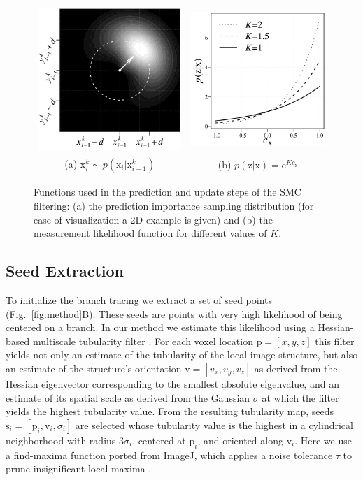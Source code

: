 \begin{figure}
	\centering
	\begin{tabular}{cc}
		\includegraphics[width=0.35\columnwidth]{fig2a} &
		\includegraphics[width=0.35\columnwidth]{fig2b} \\ %
		(a) $\mathrm{x}_{i}^k \sim p(\mathrm{x}_i | \mathrm{x}_{i-1}^k)$ & \hspace{2em} 
		(b) $p(\mathrm{z} | \mathrm{x})=\textrm{e}^{Kc_{\mathrm{x}}}$ \\
	\end{tabular}
	\caption{Functions used in the prediction and update steps of the SMC filtering: (a) the prediction importance sampling distribution (for ease of visualization a 2D example is given) and (b) the measurement likelihood function for different values of $K$.}
	\label{fig2}%
\end{figure}

\subsection{Seed Extraction}
\label{subsec:seed-extraction}
To initialize the branch tracing we extract a set of seed points (Fig.~\ref{fig:method}B). These seeds are points with very high likelihood of being centered on a branch. In our method we estimate this likelihood using a Hessian-based multiscale tubularity filter \cite{frangi1998multiscale}. For each voxel location $\mathrm{p} = [x,y,z]$ this filter yields not only an estimate of the tubularity of the local image structure, but also an estimate of the structure's orientation $\mathrm{v} = [ v_x, v_y, v_z ]$ as derived from the Hessian eigenvector corresponding to the smallest absolute eigenvalue, and an estimate of its spatial scale as derived from the Gaussian $\sigma$ at which the filter yields the highest tubularity value. From the resulting tubularity map, seeds $\mathrm{s}_i = [ \mathrm{p}_i, \mathrm{v}_i, \sigma_i ]$ are selected whose tubularity value is the highest in a cylindrical neighborhood with radius $3\sigma_i$, centered at $\mathrm{p}_i$, and oriented along $\mathrm{v}_i$. Here we use a find-maxima function ported from ImageJ, which applies a noise tolerance $\tau$ to prune insignificant local maxima \cite{imagejguide}.

